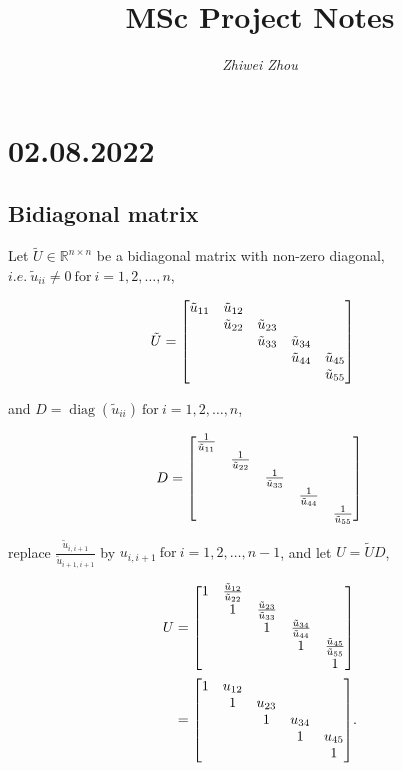 \documentclass[11pt]{article}
\title{\textbf{MSc Project Notes}}
\author{\textit{Zhiwei Zhou}}
\newcommand{\diag}{\mathop{\mathrm{diag}}}
\begin{document}
\maketitle

\section{02.08.2022}
\subsection{Bidiagonal matrix}

\noindent Let $\tilde{U} \in \mathbb{R}^{n \times n}$ be a bidiagonal matrix with non-zero diagonal, 
$i.e. \ \tilde{u}_{ii} \neq 0 \ \text{for} \ i = 1, 2, \ldots , n$,

\begin{align*}
    \tilde{U} &= \mqty[
        \tilde{u}_{11} & \tilde{u}_{12} &   &   &  \\
          & \tilde{u}_{22} & \tilde{u}_{23} &   &  \\
          &   & \tilde{u}_{33} & \tilde{u}_{34} &  \\
          &   &   & \tilde{u}_{44} & \tilde{u}_{45}\\
          &   &   &   & \tilde{u}_{55}
        ]
\end{align*}

\noindent and $D = \diag(\tilde{u}_{ii})\ \text{for} \ i = 1, 2, \ldots , n$,


\begin{align*}
    D = \mqty[
        \frac{1}{\tilde{u}_{11}} &   &   &   &  \\
          & \frac{1}{\tilde{u}_{22}} &   &   &  \\
          &   & \frac{1}{\tilde{u}_{33}} &   &  \\
          &   &   & \frac{1}{\tilde{u}_{44}} &  \\
          &   &   &   & \frac{1}{\tilde{u}_{55}}
        ]
\end{align*}


\noindent replace $\frac{\tilde{u}_{i, i+1}}{\tilde{u}_{i+1, i+1}}$ by $u_{i, i+1}\ \text{for} \ i = 1, 2, \ldots , n-1$, and let $U = \tilde{U}D$,



\begin{align*}
    U &= \mqty[
        1 & \frac{\tilde{u}_{12}}{\tilde{u}_{22}} &   &   &  \\
          & 1 & \frac{\tilde{u}_{23}}{\tilde{u}_{33}} &   &  \\
          &   & 1 & \frac{\tilde{u}_{34}}{\tilde{u}_{44}} &  \\
          &   &   & 1 & \frac{\tilde{u}_{45}}{\tilde{u}_{55}}\\
          &   &   &   & 1
        ]\\
    &= \mqty[
        1 & u_{12} &   &   &  \\
          & 1 & u_{23} &   &  \\
          &   & 1 & u_{34} &  \\
          &   &   & 1 & u_{45}\\
          &   &   &   & 1
    ].
\end{align*}
\end{document}
